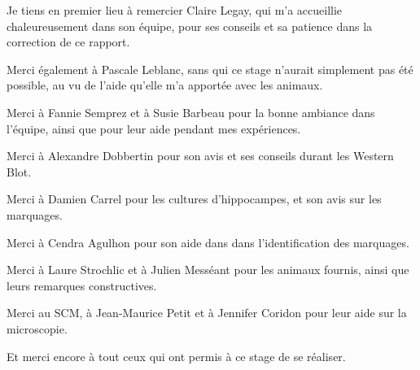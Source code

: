Je tiens en premier lieu à remercier Claire Legay, qui m'a accueillie chaleureusement dans son équipe, pour ses conseils et sa patience dans la correction de ce rapport.

{\setlength{\parindent}{0cm}
Merci également à Pascale Leblanc, sans qui ce stage n'aurait simplement pas été possible, au vu de l'aide qu'elle m'a apportée avec les animaux.

Merci à Fannie Semprez et à Susie Barbeau pour la bonne ambiance dans l'équipe, ainsi que pour leur aide pendant mes expériences.

Merci à Alexandre Dobbertin pour son avis et ses conseils durant les Western Blot.

Merci à Damien Carrel pour les cultures d'hippocampes, et son avis sur les marquages.

Merci à Cendra Agulhon pour son aide dans dans l'identification des marquages.

Merci à Laure Strochlic et à Julien Messéant pour les animaux fournis, ainsi que leurs remarques constructives.

Merci au SCM, à Jean-Maurice Petit et à Jennifer Coridon pour leur aide sur la microscopie.

Et merci encore à tout ceux qui ont permis à ce stage de se réaliser.}
